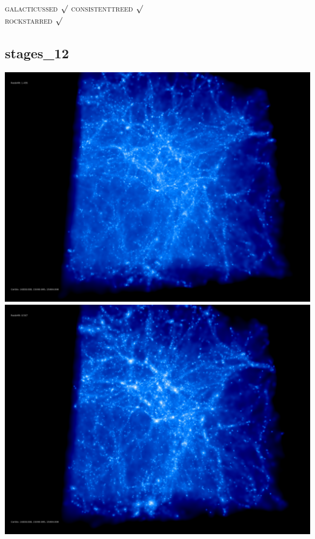 \textsc{galacticussed} $\surd$
\textsc{consistenttreed} $\surd$ \\ 
\textsc{rockstarred} $\surd$
 
% 
%
%
%
%
%
%
%

\newpage
\subsection{stages\_12}

\includegraphics[scale=0.1]{r256/stages_12/50.jpg} 
\includegraphics[scale=0.1]{r256/stages_12/100.jpg}  \\


